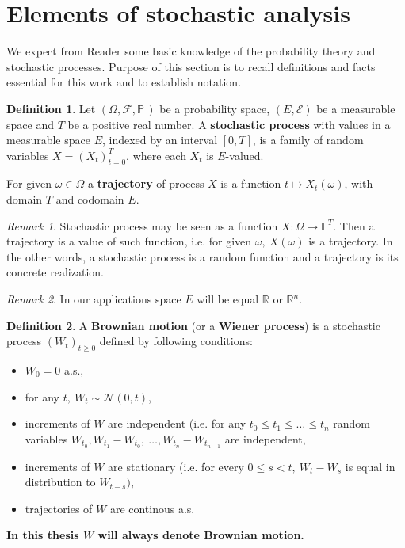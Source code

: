 \documentclass[a4paper,11pt, twoside]{book}
\theoremstyle{definition}
\newtheorem{mydef}{Definition}[chapter]
\theoremstyle{remark}
\newtheorem{remark}{Remark}[chapter]
\def\P{{\mathbb{P}}\,}
\def\R{{\mathbb{R}}}
\begin{document}
\section{Elements of stochastic analysis}
We expect from Reader some basic knowledge of the probability theory and stochastic processes. Purpose of this section is to recall definitions and facts essential for this work and to establish notation.

\begin{mydef}
 Let $(\Omega, \mathcal{F}, \P)$ be a probability space, $(E, \mathcal{E})$ be a measurable space and $T$ be a positive real number. A \textbf{stochastic process} with values in a measurable space $E$, indexed by an interval $[0,T]$, is a family of random variables $X = (X_t)_{t = 0}^T$, where each $X_t$ is $E$-valued.
 
 For given $\omega \in \Omega$ a \textbf{trajectory} of process $X$ is a function $t \mapsto X_t(\omega)$, with domain $T$ and codomain $E$.
\end{mydef}

\begin{remark}
 Stochastic process may be seen as a function $X: \Omega \rightarrow \mathbb{E}^T$. Then a trajectory is a value of such function, i.e. for given $\omega,\ X(\omega)$ is a trajectory. In the other words, a stochastic process is a random function and a trajectory is its concrete realization.
\end{remark}

\begin{remark}
 In our applications space $E$ will be equal $\R$ or $\R^n$. 
\end{remark}

\begin{mydef}
 A \textbf{Brownian motion} (or a \textbf{Wiener process}) is a stochastic process $(W_t)_{t \geq 0}$ defined by following conditions:
 \begin{itemize}
  \item $W_0 = 0$ a.s.,
  \item for any $t,\ W_t \sim \mathcal{N}(0,t)$,
  \item increments of $W$ are independent (i.e. for any $t_0 \leq t_1 \leq \ldots \leq t_n$ random variables $W_{t_0}, W_{t_1} - W_{t_0},\ \ldots, W_{t_n} - W_{t_{n-1}}$ are independent,
  \item increments of $W$ are stationary (i.e. for every $0 \leq s < t,\ W_t-W_s$ is equal in distribution to $W_{t-s})$,
  \item trajectories of $W$ are continous a.s.
 \end{itemize}
\end{mydef}
\noindent \textbf{In this thesis $W$ will always denote Brownian motion.}
\end{document}
